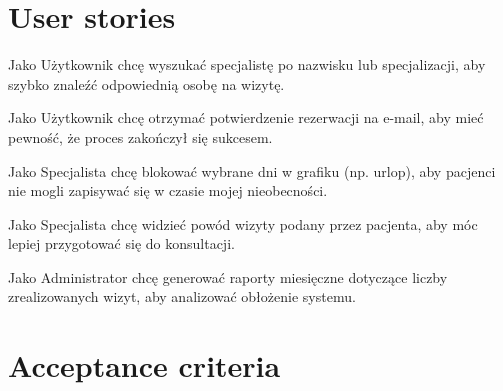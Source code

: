 \documentclass[12pt,a4paper]{article}
\begin{document}
\section{User stories}
\begin{description}[leftmargin=1.8cm, labelwidth=1.3cm, labelsep=0.5cm]
    \item[US1] Jako Użytkownik chcę wyszukać specjalistę po nazwisku lub specjalizacji, aby szybko znaleźć odpowiednią osobę na wizytę.
    \item[US2] Jako Użytkownik chcę otrzymać potwierdzenie rezerwacji na e-mail, aby mieć pewność, że proces zakończył się sukcesem.
    \item[US3] Jako Specjalista chcę blokować wybrane dni w grafiku (np. urlop), aby pacjenci nie mogli zapisywać się w czasie mojej nieobecności.
    \item[US4] Jako Specjalista chcę widzieć powód wizyty podany przez pacjenta, aby móc lepiej przygotować się do konsultacji.
    \item[US5] Jako Administrator chcę generować raporty miesięczne dotyczące liczby zrealizowanych wizyt, aby analizować obłożenie systemu.
\end{description}

\section{Acceptance criteria}
\end{document}
